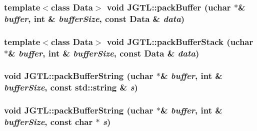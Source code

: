 \hypertarget{namespace_j_g_t_l_b04f627a23eb9d82666a9b82385365dc}{
\subsubsection[packBuffer]{\setlength{\rightskip}{0pt plus 5cm}template$<$class Data$>$ void JGTL::pack\-Buffer (uchar $\ast$\& {\em buffer}, int \& {\em buffer\-Size}, const Data \& {\em data})}}
\label{namespace_j_g_t_l_b04f627a23eb9d82666a9b82385365dc}


\hypertarget{namespace_j_g_t_l_5a10f965c64c24619d6a7db5db42750a}{
\subsubsection[packBufferStack]{\setlength{\rightskip}{0pt plus 5cm}template$<$class Data$>$ void JGTL::pack\-Buffer\-Stack (uchar $\ast$\& {\em buffer}, int \& {\em buffer\-Size}, const Data \& {\em data})}}
\label{namespace_j_g_t_l_5a10f965c64c24619d6a7db5db42750a}


\hypertarget{namespace_j_g_t_l_10113799bfd8b9221337e9eb1db3e2ec}{
\subsubsection[packBufferString]{\setlength{\rightskip}{0pt plus 5cm}void JGTL::pack\-Buffer\-String (uchar $\ast$\& {\em buffer}, int \& {\em buffer\-Size}, const std::string \& {\em s})}}
\label{namespace_j_g_t_l_10113799bfd8b9221337e9eb1db3e2ec}


\hypertarget{namespace_j_g_t_l_0f1a14885672c043d37fe1c2870e5fd5}{
\subsubsection[packBufferString]{\setlength{\rightskip}{0pt plus 5cm}void JGTL::pack\-Buffer\-String (uchar $\ast$\& {\em buffer}, int \& {\em buffer\-Size}, const char $\ast$ {\em s})}}
\label{namespace_j_g_t_l_0f1a14885672c043d37fe1c2870e5fd5}


